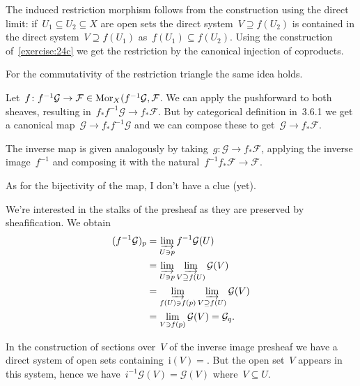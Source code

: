 \begin{exercise}
  The induced restriction morphism follows from the construction using the direct limit: if~$U_1\subseteq U_2\subseteq X$ are open sets the direct system~$V\supseteq f(U_2)$ is contained in the direct system~$V\supseteq f(U_1)$ as~$f(U_1)\subseteq f(U_2)$. Using the construction of~\autoref{exercise:24c} we get the restriction by the canonical injection of coproducts.

  For the commutativity of the restriction triangle the same idea holds.
\end{exercise}

\begin{exercise}
  \label{exercise:36b}
  Let~$f\colon f^{-1}\mathcal{G}\to\mathcal{F}\in\operatorname{Mor}_X(f^{-1}\mathcal{G},\mathcal{F}$. We can apply the pushforward to both sheaves, resulting in~$f_*f^{-1}\mathcal{G}\to f_*\mathcal{F}$. But by categorical definition in~3.6.1 we get a canonical map~$\mathcal{G}\to f_*f^{-1}\mathcal{G}$ and we can compose these to get~$\mathcal{G}\to f_*\mathcal{F}$.

  The inverse map is given analogously by taking~$g\colon\mathcal{G}\to f_*\mathcal{F}$, applying the inverse image~$f^{-1}$ and composing it with the natural~$f^{-1}f_*\mathcal{F}\to\mathcal{F}$.

  As for the bijectivity of the map, I don't have a clue (yet).
\end{exercise}

\begin{exercise}
  We're interested in the stalks of the presheaf as they are preserved by sheafification. We obtain
  \begin{equation}
    \begin{aligned}
      (f^{-1}\mathcal{G})_p&=\varinjlim_{U\ni p}f^{-1}\mathcal{G}(U) \\
      &=\varinjlim_{U\ni p}\varinjlim_{V\supseteq f(U)}\mathcal{G}(V) \\
      &=\varinjlim_{f(U)\ni f(p)}\varinjlim_{V\supseteq f(U)}\mathcal{G}(V) \\
      &=\lim_{V\ni f(p)}\mathcal{G}(V)=\mathcal{G}_q.
    \end{aligned}
  \end{equation}
\end{exercise}

\begin{exercise}
  \label{exercise:36c}
  In the construction of sections over~$V$ of the inverse image presheaf we have a direct system of open sets containing~$\mathrm{i}(V)=$. But the open set~$V$ appears in this system, hence we have~$i^{-1}\mathcal{G}(V)=\mathcal{G}(V)$ where~$V\subseteq U$.
\end{exercise}

